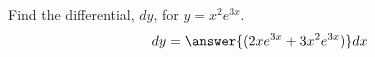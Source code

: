 \documentclass{ximera}
\author{Gregory Hartman \and Matthew Carr}
\begin{document}
\begin{exercise}




Find the differential, $dy$, for $y=x^{2}e^{3x}$.
\[
dy=\answer{(2xe^{3x}+3x^2e^{3x})}dx
\]

\end{exercise}
\end{document}
